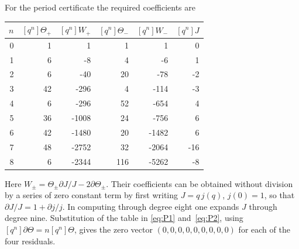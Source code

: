 \documentclass[11pt,a4paper]{article}
\theoremstyle{remark}\newtheorem{remark}[theorem]{Remark}
\newcommand{\dd}{\partial}\newcommand{\Tp}{\mathcal T_p}
\begin{document}
For the period certificate the required coefficients are
\begin{center}\small
\begin{tabular}{r r r r r r}
\toprule
$n$&$[q^n]\Theta_+$&$[q^n]W_+$&$[q^n]\Theta_-$&$[q^n]W_-$&$[q^n]J$\\\midrule
0&1&1&1&1&0\\
1&6&-8&4&-6&1\\
2&6&-40&20&-78&-2\\
3&42&-296&4&-114&-3\\
4&6&-296&52&-654&4\\
5&36&-1008&24&-756&6\\
6&42&-1480&20&-1482&6\\
7&48&-2752&32&-2064&-16\\
8&6&-2344&116&-5262&-8\\\bottomrule
\end{tabular}
\end{center}
Here $W_\pm=\Theta_\pm\dd J/J-2\dd\Theta_\pm$.
Their coefficients can be obtained without division by a series of zero
constant term by first writing $J=q\,j(q)$, $j(0)=1$, so that
$\dd J/J=1+\dd j/j$. In computing through degree eight one expands
$J$ through degree nine. Substitution of the table in
\eqref{eq:P1} and~\eqref{eq:P2}, using
$[q^n]\dd\Theta=n[q^n]\Theta$, gives the zero vector
$(0,0,0,0,0,0,0,0,0)$ for each of the four residuals.
\end{document}
